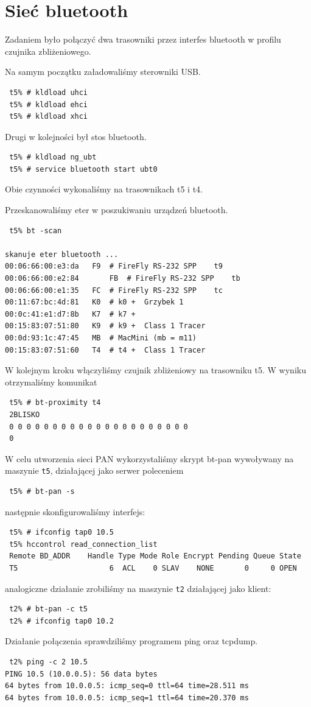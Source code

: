 \documentclass[a4paper,11pt,notitlepage]{article}
\begin{document}
\section{Sieć bluetooth} 

Zadaniem było połączyć dwa trasowniki przez interfes bluetooth w profilu czujnika zbliżeniowego.

Na samym początku załadowaliśmy sterowniki USB.
\begin{verbatim}
 t5% # kldload uhci
 t5% # kldload ehci
 t5% # kldload xhci
\end{verbatim}
Drugi w kolejności był stos bluetooth.
\begin{verbatim}
 t5% # kldload ng_ubt
 t5% # service bluetooth start ubt0
\end{verbatim}
Obie czynności wykonaliśmy na trasownikach t5 i t4.

Przeskanowaliśmy eter w poszukiwaniu urządzeń bluetooth.
\begin{verbatim}
 t5% bt -scan

skanuje eter bluetooth ...
00:06:66:00:e3:da	F9	# FireFly RS-232 SPP 	t9
00:06:66:00:e2:84       FB	# FireFly RS-232 SPP 	tb
00:06:66:00:e1:35	FC	# FireFly RS-232 SPP	tc
00:11:67:bc:4d:81	K0	# k0 +	Grzybek 1
00:0c:41:e1:d7:8b	K7	# k7 +
00:15:83:07:51:80	K9	# k9 +	Class 1 Tracer
00:0d:93:1c:47:45	MB	# MacMini (mb = m11)
00:15:83:07:51:60	T4	# t4 +	Class 1 Tracer
\end{verbatim}

W kolejnym kroku włączyliśmy czujnik zbliżeniowy na trasowniku t5.
W wyniku otrzymaliśmy komunikat
\begin{verbatim}
 t5% # bt-proximity t4
 2BLISKO
 0 0 0 0 0 0 0 0 0 0 0 0 0 0 0 0 0 0 0 0 0
 0
\end{verbatim}

W celu utworzenia sieci PAN wykorzystaliśmy skrypt bt-pan wywoływany na maszynie \verb+t5+, działającej jako serwer poleceniem 
\begin{verbatim}
 t5% # bt-pan -s
\end{verbatim}
następnie skonfigurowaliśmy interfejs:
\begin{verbatim}
 t5% # ifconfig tap0 10.5
 t5% hccontrol read_connection_list
 Remote BD_ADDR    Handle Type Mode Role Encrypt Pending Queue State
 T5                     6  ACL    0 SLAV    NONE       0     0 OPEN
\end{verbatim}
analogiczne działanie zrobiliśmy na maszynie \verb+t2+ działającej jako klient:
\begin{verbatim}
 t2% # bt-pan -c t5
 t2% # ifconfig tap0 10.2
\end{verbatim}
Działanie połączenia sprawdziliśmy programem ping oraz tcpdump.
\begin{verbatim}
 t2% ping -c 2 10.5
PING 10.5 (10.0.0.5): 56 data bytes
64 bytes from 10.0.0.5: icmp_seq=0 ttl=64 time=28.511 ms
64 bytes from 10.0.0.5: icmp_seq=1 ttl=64 time=20.370 ms
\end{verbatim}
\end{document}

